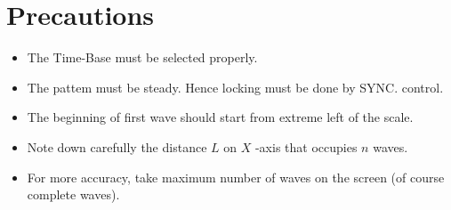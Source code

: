 \documentclass{article}
\begin{document}
\section{Precautions}
\begin{itemize}
    \item The Time-Base must be selected properly.
    \item The pattem must be steady. Hence locking must be done by SYNC. control.
    \item The beginning of first wave should start from extreme left of the scale.
    \item Note down carefully the distance $L$ on $X$ -axis that occupies $n$ waves.
    \item For more accuracy, take maximum number of waves on the screen (of course complete waves).
\end{itemize}
\end{document}
